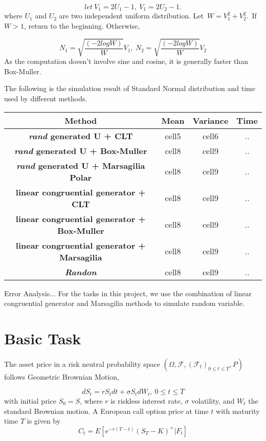\documentclass[12pt,a4paper,fleqn]{article}
\begin{document}
$$ let \ V_1 = 2U_1-1,\  V_1 = 2U_2-1.$$
where $U_1$ and $U_2$ are two independent uniform distribution.
 Let\ $W = V_1^2+V_2^2.$\ If $W>1$, return to the beginning. Otherwise,

$$N_1 = \sqrt{\frac{(-2logW)}{W}}V_1,\ N_2 = \sqrt{\frac{(-2logW)}{W}}V_2$$As the computation doesn’t involve sine and cosine, it is generally faster than Box-Muller.

The following is the simulation result of Standard Normal distribution and time used by different methods.
\begin{center}
\begin{tabular}{| c| c| c| c| }
\hline
\textbf{ Method} &\textbf{ Mean} & \textbf{Variance}&\textbf{ Time} \\ \hline
\textbf{\textit{ rand} generated U + CLT} & cell5 & cell6&.. \\  \hline
\textbf{\textit{ rand} generated U + Box-Muller} & cell8 & cell9&..\\ \hline
\textbf{\textit{ rand} generated U + Marsagilia Polar} & cell8 & cell9&..\\ \hline
\textbf{ linear congruential generator + CLT} & cell8 & cell9&..\\ \hline
\textbf{linear congruential generator + Box-Muller} & cell8 & cell9&..\\ \hline
\textbf{ linear congruential generator + Marsagilia} & cell8 & cell9&..\\ \hline
\textbf{\textit{Randon} }& cell8 & cell9&..\\ \hline

\end{tabular}
\end{center}

Error Analysis...
For the tasks in this project, we use the combination of linear congruential generator and Marsagilia methods to simulate random variable.

\section{Basic Task}


The asset price in a risk neutral probability space $(\Omega, \mathcal{F}, (\mathcal{F}_t)_{0\leq t\leq T}, P)$ follows Geometric Brownian Motion,

$$dS_t=rS_tdt+\sigma S_tdW_t, \ 0\leq t \leq T$$
with initial price $S_0 = S$, where $r$ is riskless interest rate, $\sigma$ volatility, and $W_t$ the standard Brownian motion. A European call option price at time $t$ with maturity time $T$ is given by
$$C_t = E[e^{-r(T-t)}(S_T-K)^+|\textit{F}_t]$$
\end{document}
